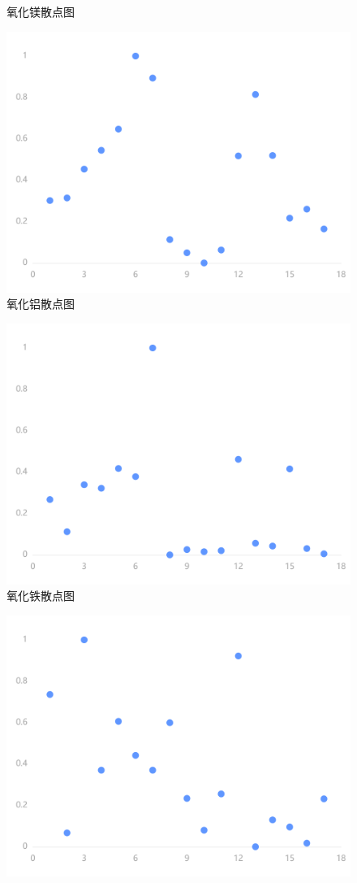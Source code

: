 \documentclass[UTF8]{ctexart}
\begin{document}
\begin{figure}[H]
    \caption{氧化镁散点图} %
\end{figure}\begin{figure}[H]\centering
    \includegraphics[width=1\textwidth,height=0.6\textwidth]{img/5.png} %
    \caption{氧化铝散点图} %
\end{figure}\begin{figure}[H]\centering
    \includegraphics[width=1\textwidth,height=0.6\textwidth]{img/6.png} %
    \caption{氧化铁散点图} %
\end{figure}\begin{figure}[H]\centering
    \includegraphics[width=1\textwidth,height=0.6\textwidth]{img/7.png} %

\end{figure}
\end{document}
